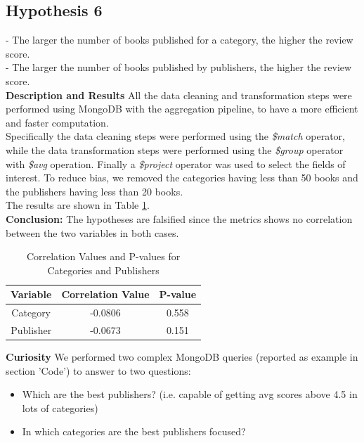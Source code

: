 \subsection*{Hypothesis 6}

- The larger the number of books published for a category, the higher the review score.\\ 
- The larger the number of books published by publishers, the higher the review score.\\

\noindent
\textbf{Description and Results}
All the data cleaning and transformation steps were performed using MongoDB with the aggregation pipeline, to have a more efficient and faster computation.\\
Specifically the data cleaning steps were performed using the \textit{\$match} operator, while the data transformation steps were performed using the \textit{\$group} operator with \textit{\$avg} operation.
Finally a \textit{\$project} operator was used to select the fields of interest. To reduce bias, we removed the categories having less than 50 books and the publishers having less than 20 books.\\
The results are shown in Table \ref{tab:h6_correlations}.\\
\textbf{Conclusion:} The hypotheses are falsified since the metrics shows no correlation between the two variables in both cases.

\begin{table}[H]
    \centering
    \caption{Correlation Values and P-values for Categories and Publishers}
    \begin{tabular}{|c|c|c|}
    \hline
    \textbf{Variable} & \textbf{Correlation Value} & \textbf{P-value} \\
    \hline
    Category & -0.0806 & 0.558 \\
    \hline
    Publisher & -0.0673 & 0.151 \\
    \hline
    \end{tabular}
    \label{tab:h6_correlations}
\end{table}

\vspace{0.5cm}
\noindent 
\textbf{Curiosity}
We performed two complex MongoDB queries (reported as example in section 'Code') to answer to two questions:\\
\begin{itemize}
    \item Which are the best publishers? (i.e. capable of getting avg scores above 4.5 in lots of categories)
    \item In which categories are the best publishers focused?
\end{itemize}

